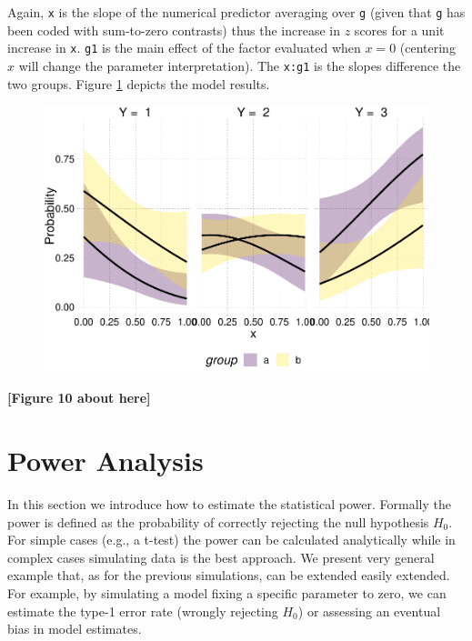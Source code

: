 \documentclass[
  man,floatsintext]{apa6}
\begin{document}
\normalsize

Again, \texttt{x} is the slope of the numerical predictor averaging over \texttt{g} (given that \texttt{g} has been coded with sum-to-zero contrasts) thus the increase in \(z\) scores for a unit increase in \texttt{x}. \texttt{g1} is the main effect of the factor evaluated when \(x = 0\) (centering \(x\) will change the parameter interpretation). The \texttt{x:g1} is the slopes difference the two groups. Figure \ref{fig:fig-effects-num-by-cat-interaction} depicts the model results.

\scriptsize

\begin{figure}

{\centering \includegraphics{paper_files/figure-latex/fig-effects-num-by-cat-interaction-1} 

}

\caption{ }\label{fig:fig-effects-num-by-cat-interaction}
\end{figure}

\begin{center}\textbf{[Figure 10 about here]} \end{center}

\normalsize

\section{Power Analysis}\label{power-analysis}

In this section we introduce how to estimate the statistical power. Formally the power is defined as the probability of correctly rejecting the null hypothesis \(H_0\). For simple cases (e.g., a t-test) the power can be calculated analytically while in complex cases simulating data is the best approach. We present very general example that, as for the previous simulations, can be extended easily extended. For example, by simulating a model fixing a specific parameter to zero, we can estimate the type-1 error rate (wrongly rejecting \(H_0\)) or assessing an eventual bias in model estimates.
\end{document}
